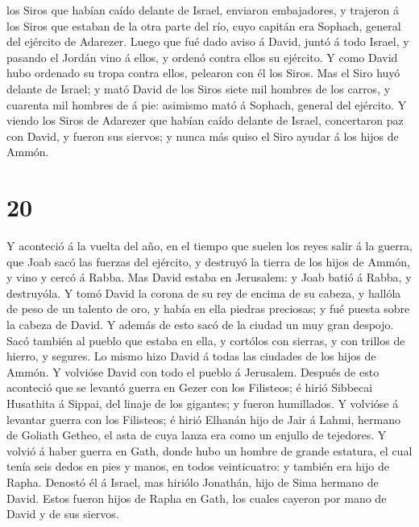los Siros que habían caído delante de Israel, enviaron embajadores, y
trajeron á los Siros que estaban de la otra parte del río, cuyo capitán
era Sophach, general del ejército de Adarezer.  Luego que
fué dado aviso á David, juntó á todo Israel, y pasando el Jordán vino á
ellos, y ordenó contra ellos su ejército. Y como David hubo ordenado su
tropa contra ellos, pelearon con él los Siros.  Mas el
Siro huyó delante de Israel; y mató David de los Siros siete mil hombres
de los carros, y cuarenta mil hombres de á pie: asimismo mató á Sophach,
general del ejército.  Y viendo los Siros de Adarezer que
habían caído delante de Israel, concertaron paz con David, y fueron sus
siervos; y nunca más quiso el Siro ayudar á los hijos de Ammón.

\hypertarget{section-19}{%
\section{20}\label{section-19}}

 Y aconteció á la vuelta del año, en el tiempo que suelen
los reyes salir á la guerra, que Joab sacó las fuerzas del ejército, y
destruyó la tierra de los hijos de Ammón, y vino y cercó á Rabba. Mas
David estaba en Jerusalem: y Joab batió á Rabba, y destruyóla.
 Y tomó David la corona de su rey de encima de su cabeza,
y hallóla de peso de un talento de oro, y había en ella piedras
preciosas; y fué puesta sobre la cabeza de David. Y además de esto sacó
de la ciudad un muy gran despojo.  Sacó también al pueblo
que estaba en ella, y cortólos con sierras, y con trillos de hierro, y
segures. Lo mismo hizo David á todas las ciudades de los hijos de Ammón.
Y volvióse David con todo el pueblo á Jerusalem.  Después
de esto aconteció que se levantó guerra en Gezer con los Filisteos; é
hirió Sibbecai Husathita á Sippai, del linaje de los gigantes; y fueron
humillados.  Y volvióse á levantar guerra con los
Filisteos; é hirió Elhanán hijo de Jair á Lahmi, hermano de Goliath
Getheo, el asta de cuya lanza era como un enjullo de tejedores.
 Y volvió á haber guerra en Gath, donde hubo un hombre de
grande estatura, el cual tenía seis dedos en pies y manos, en todos
veinticuatro: y también era hijo de Rapha.  Denostó él á
Israel, mas hiriólo Jonathán, hijo de Sima hermano de David.
 Estos fueron hijos de Rapha en Gath, los cuales cayeron
por mano de David y de sus siervos.

